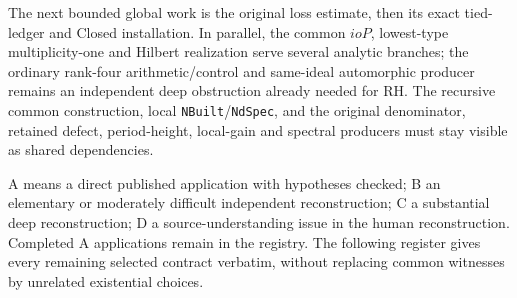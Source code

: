 The next bounded global work is the original loss estimate, then
its exact tied-ledger and Closed installation. In parallel, the
common \(ioP\), lowest-type multiplicity-one and Hilbert realization
serve several analytic branches; the ordinary rank-four
arithmetic/control and same-ideal automorphic producer remains an
independent deep obstruction already needed for RH. The recursive
common construction, local \texttt{NBuilt}/\texttt{NdSpec}, and the
original denominator, retained defect, period-height, local-gain
and spectral producers must stay visible as shared dependencies.

A means a direct published application with hypotheses checked;
B an elementary or moderately difficult independent reconstruction;
C a substantial deep reconstruction; D a source-understanding
issue in the human reconstruction. Completed A applications remain
in the registry. The following register gives every remaining
selected contract verbatim, without replacing common witnesses
by unrelated existential choices.
